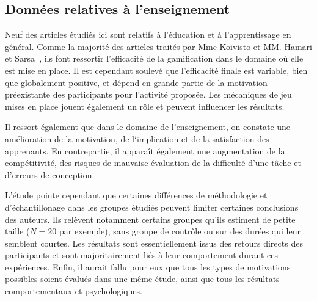 \subsection{Données relatives à l'enseignement}
Neuf des articles étudiés ici sont relatifs à l'éducation et à l'apprentissage en général. Comme la majorité des articles traités par Mme Koivisto et MM. Hamari et Sarsa~\cite{gamif-review}, ils font ressortir l’efficacité de la gamification dans le domaine où elle est mise en place. Il est cependant soulevé que l'efficacité finale est variable, bien que globalement positive, et dépend en grande partie de la motivation préexistante des participants pour l’activité proposée. Les mécaniques de jeu mises en place jouent également un rôle et peuvent influencer les résultats. \par 

Il ressort également que dans le domaine de l’enseignement, on constate une amélioration de la motivation, de l‘implication et de la satisfaction des apprenants. En contrepartie, il apparaît également une augmentation de la compétitivité, des risques de mauvaise évaluation de la difficulté d’une tâche et d’erreurs de conception. \par

L'étude pointe cependant que certaines différences de méthodologie et d'échantillonage dans les groupes étudiés peuvent limiter certaines conclusions des auteurs. Ils relèvent notamment certains groupes qu'ils estiment de petite taille ($N=20$ par exemple), sans groupe de contrôle ou sur des durées qui leur semblent courtes. Les résultats sont essentiellement issus des retours directs des participants et sont majoritairement liés à leur comportement durant ces expériences. Enfin, il aurait fallu pour eux que tous les types de motivations possibles soient évalués dans une même étude, ainsi que tous les résultats comportementaux et psychologiques.
